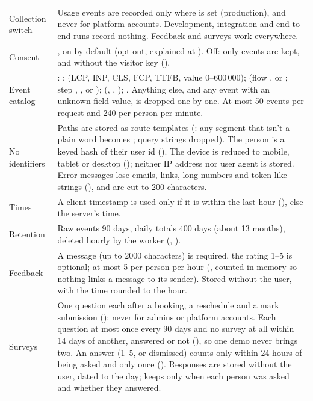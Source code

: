 {\tablefont
\begin{xltabular}{\linewidth}{@{}P{38mm} L@{}}
  \toprule
   & \\
  \midrule
  \endhead
  Collection switch & Usage events are recorded only where  is set (production), and never for platform accounts. Development, integration and end-to-end runs record nothing. Feedback and surveys work everywhere.\\
  Consent & , on by default (opt-out, explained at ). Off: only  events are kept, and without the visitor key ().\\
  Event catalog & : ;  (LCP, INP, CLS, FCP, TTFB, value 0--600\,000);  (flow ,  or ; step , ,  or );  (, , ); . Anything else, and any event with an unknown field value, is dropped one by one. At most 50 events per request and 240 per person per minute.\\
  No identifiers & Paths are stored as route templates (: any segment that isn't a plain word becomes ; query strings dropped). The person is a keyed hash of their user id (). The device is reduced to mobile, tablet or desktop (); neither IP address nor user agent is stored. Error messages lose emails, links, long numbers and token-like strings (), and are cut to 200 characters.\\
  Times & A client timestamp is used only if it is within the last hour (), else the server's time.\\
  Retention & Raw events 90 days, daily totals 400 days (about 13 months), deleted hourly by the worker (, ).\\
  Feedback & A message (up to 2000 characters) is required, the rating 1--5 is optional; at most 5 per person per hour (, counted in memory so nothing links a message to its sender). Stored without the user, with the time rounded to the hour.\\
  Surveys & One question each after a booking, a reschedule and a mark submission (); never for admins or platform accounts. Each question at most once every 90 days and no survey at all within 14 days of another, answered or not (), so one demo never brings two. An answer (1--5, or dismissed) counts only within 24 hours of being asked and only once (). Responses are stored without the user, dated to the day;  keeps only when each person was asked and whether they answered.\\
  \bottomrule
\end{xltabular}}

